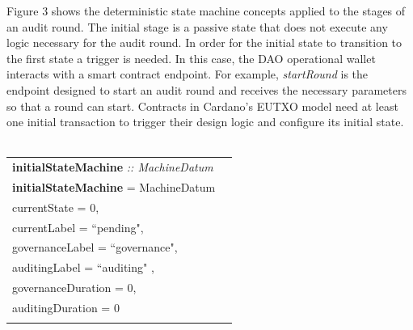 \documentclass[9pt]{article}
\begin{document}
Figure 3 shows the deterministic state machine concepts applied to the stages of an audit round. The initial stage is a passive state that does not execute any logic necessary for the audit round. In order for the initial state to transition to the first state a trigger is needed. In this case, the DAO operational wallet interacts with a smart contract endpoint. For example, \emph{startRound} is the endpoint designed to start an audit round and receives the necessary parameters so that a round can start. Contracts in Cardano's EUTXO model need at least one initial transaction to trigger their design logic and configure its initial state.
\\
\\
\begin{tabular}{lr}
\textbf{initialStateMachine} \emph{:: MachineDatum}\\
\textbf{initialStateMachine}  = MachineDatum  \textbraceleft{}
\\ \hspace{60mm}currentState = 0, 
\\ \hspace{60mm}currentLabel = ``pending",
\\ \hspace{60mm}governanceLabel = ``governance",
\\ \hspace{60mm}auditingLabel = ``auditing" ,
\\ \hspace{60mm}governanceDuration = 0,
\\ \hspace{60mm}auditingDuration = 0
\\\hspace{60mm}\textbraceright{} 
\end{tabular}
\\
\\
\end{document}
